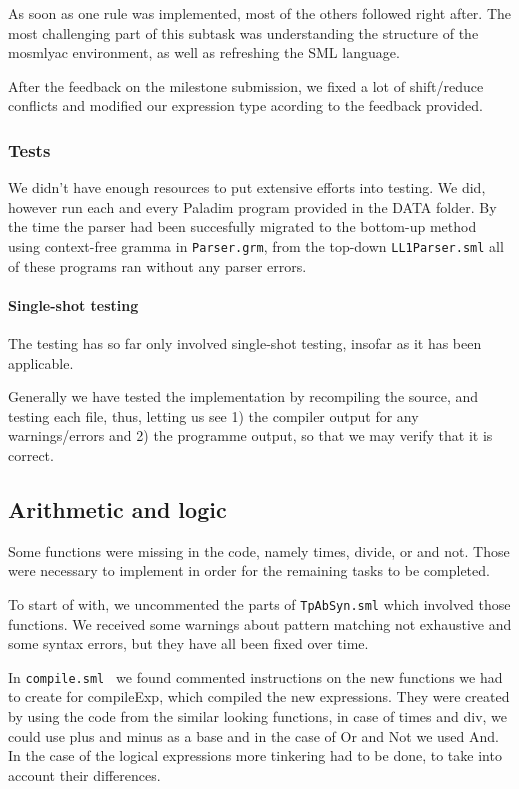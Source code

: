 \documentclass[11pt]{article}
\begin{document}
As soon as one rule was implemented, most of the others followed right after. The most challenging part of this subtask was understanding the structure of the mosmlyac environment, as well as refreshing the SML language.

After the feedback on the milestone submission, we fixed a lot of shift/reduce conflicts and modified our expression type acording to the feedback provided.

\subsubsection*{Tests}
We didn't have enough resources to put extensive efforts into testing. We did, however run each and every Paladim program provided in the DATA folder. By the time the parser had been succesfully migrated to the bottom-up method using context-free gramma in {\tt Parser.grm}, from the top-down {\tt LL1Parser.sml} all of these programs ran without any parser errors.

\paragraph{Single-shot testing}
The testing has so far only involved single-shot testing, insofar as it has been applicable.

Generally we have tested the implementation by recompiling the source, and testing each file, thus, letting us see 1) the compiler output for any warnings/errors and 2) the programme output, so that we may verify that it is correct.

\subsection*{Arithmetic and logic}
Some functions were missing in the code, namely times, divide, or and not. Those were necessary to implement in order for the remaining tasks to be completed.

To start of with, we uncommented the parts of {\tt TpAbSyn.sml} which involved  those functions. We received some  warnings about pattern matching not exhaustive and some syntax errors, but they have all been fixed over time.

In {\tt compile.sml } we found commented instructions on the new functions we had to create for compileExp, which compiled the new expressions. They were created by using the code from the similar looking functions, in case of times and div, we could use plus and minus as a base and in the case of Or and Not we used And. In the case of the logical expressions more tinkering had to be done, to take into account their differences.
\end{document}
